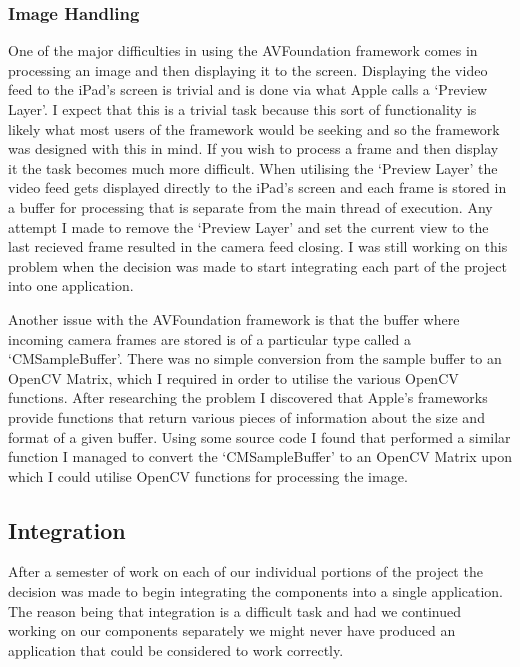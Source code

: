 \documentclass{article}
\begin{document}
\subsubsection{Image Handling}

One of the major difficulties in using the AVFoundation framework comes in processing an image and then displaying it to the screen. Displaying the video feed to the iPad's screen is trivial and is done via what Apple calls a `Preview Layer'. I expect that this is a trivial task because this sort of functionality is likely what most users of the framework would be seeking and so the framework was designed with this in mind. If you wish to process a frame and then display it the task becomes much more difficult. When utilising the `Preview Layer' the video feed gets displayed directly to the iPad's screen and each frame is stored in a buffer for processing that is separate from the main thread of execution. %
 Any attempt I made to remove the `Preview Layer' and set the current view to the last recieved frame resulted in the camera feed closing. I was still working on this problem when the decision was made to start integrating each part of the project into one application.

Another issue with the AVFoundation framework is that the buffer where incoming camera frames are stored is of a particular type called a `CMSampleBuffer'. There was no simple conversion from the sample buffer to an OpenCV Matrix, which I required in order to utilise the various OpenCV functions. After researching the problem I discovered that Apple's frameworks provide functions that return various pieces of information about the size and format of a given buffer. Using some source code I found that performed a similar function %
I managed to convert the `CMSampleBuffer' to an OpenCV Matrix upon which I could utilise OpenCV functions for processing the image.


\subsection{Integration}

After a semester of work on each of our individual portions of the project the decision was made to begin integrating the components into a single application. The reason being that integration is a difficult task and had we continued working on our components separately we might never have produced an application that could be considered to work correctly.
\end{document}
